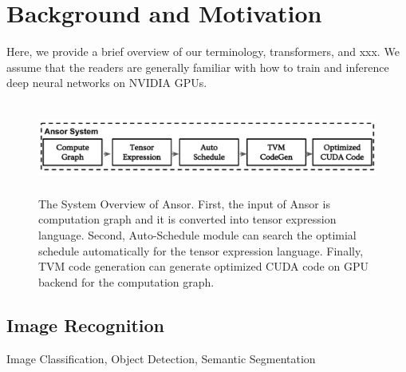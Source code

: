 \section{Background and Motivation}
\label{sec:bkg}

Here, we provide a brief overview of our terminology, transformers, and xxx. We assume that the readers are generally familiar with how to train and inference
deep neural networks on NVIDIA GPUs.






\begin{figure}[htbp]
    \centering
    \label{fig:fig6}
    \includegraphics[height=3cm, width=15cm]{figs/fig6}
    \caption{The System Overview of Ansor. First, the input of Ansor is computation graph and it is converted into tensor expression language. Second, Auto-Schedule module
    can search the optimial schedule automatically for the tensor expression language. Finally, TVM code generation can generate optimized CUDA code on GPU backend 
    for the computation graph.}
\end{figure}
\subsection{Image Recognition}
{\color{red} Image Classification, Object Detection, Semantic Segmentation}

